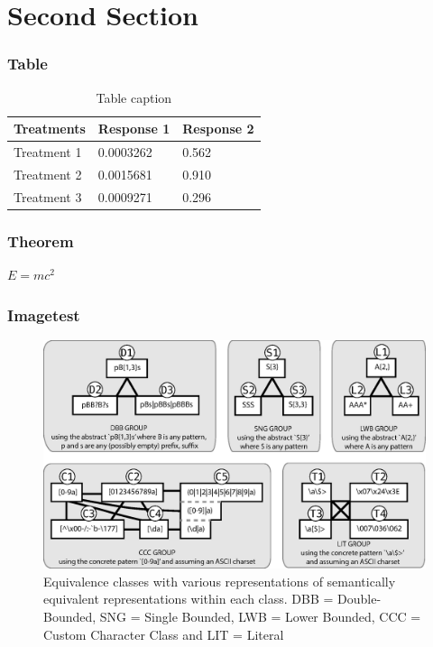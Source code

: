 
\section{Second Section}

\begin{frame}
\frametitle{Table}
\begin{table}
\begin{tabular}{l l l}
\toprule
\textbf{Treatments} & \textbf{Response 1} & \textbf{Response 2}\\
\midrule
Treatment 1 & 0.0003262 & 0.562 \\
Treatment 2 & 0.0015681 & 0.910 \\
Treatment 3 & 0.0009271 & 0.296 \\
\bottomrule
\end{tabular}
\caption{Table caption}
\end{table}
\end{frame}


\begin{frame}
\frametitle{Theorem}
\begin{theorem}
$E = mc^2$
\end{theorem}
\end{frame}



\begin{frame}
\frametitle{Imagetest}
\begin{figure}[h]
  \centering
  \includegraphics[scale=0.4]{nontex/illustrations/refactoringTree.eps}
  \caption{Equivalence classes with various representations of semantically equivalent representations within each class. DBB = Double-Bounded, SNG = Single Bounded, LWB = Lower Bounded, CCC = Custom Character Class and LIT = Literal}
  \label{fig:refactoringTree}
\end{figure}
\end{frame}
